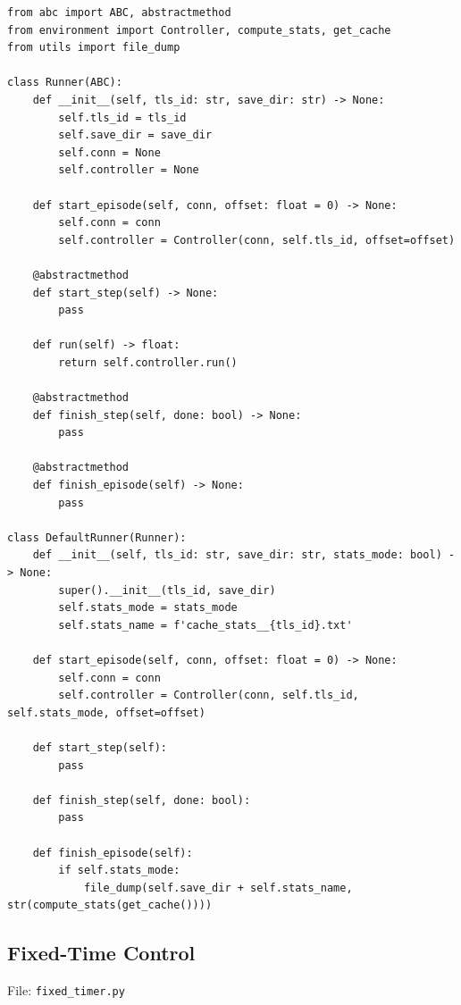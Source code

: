 \documentclass[a4paper]{report}
\begin{document}
\begin{lstlisting}[style=pythonstyle]
from abc import ABC, abstractmethod
from environment import Controller, compute_stats, get_cache
from utils import file_dump

class Runner(ABC):
    def __init__(self, tls_id: str, save_dir: str) -> None:
        self.tls_id = tls_id
        self.save_dir = save_dir
        self.conn = None
        self.controller = None

    def start_episode(self, conn, offset: float = 0) -> None:
        self.conn = conn
        self.controller = Controller(conn, self.tls_id, offset=offset)

    @abstractmethod
    def start_step(self) -> None:
        pass
    
    def run(self) -> float:
        return self.controller.run()
    
    @abstractmethod
    def finish_step(self, done: bool) -> None:
        pass

    @abstractmethod
    def finish_episode(self) -> None:
        pass

class DefaultRunner(Runner):
    def __init__(self, tls_id: str, save_dir: str, stats_mode: bool) -> None:
        super().__init__(tls_id, save_dir)
        self.stats_mode = stats_mode
        self.stats_name = f'cache_stats__{tls_id}.txt'

    def start_episode(self, conn, offset: float = 0) -> None:
        self.conn = conn
        self.controller = Controller(conn, self.tls_id, self.stats_mode, offset=offset)

    def start_step(self):
        pass

    def finish_step(self, done: bool):
        pass

    def finish_episode(self):
        if self.stats_mode:
            file_dump(self.save_dir + self.stats_name, str(compute_stats(get_cache())))
\end{lstlisting}

\subsection{Fixed-Time Control}

File: \texttt{fixed\_timer.py}
\end{document}
